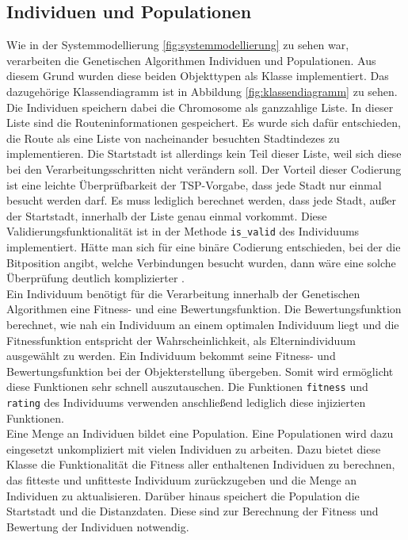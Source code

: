 \subsection{Individuen und Populationen}
Wie in der Systemmodellierung \ref{fig:systemmodellierung} zu sehen war, verarbeiten die Genetischen Algorithmen Individuen und Populationen. Aus diesem Grund wurden diese beiden Objekttypen als Klasse implementiert. Das dazugehörige Klassendiagramm ist in Abbildung \ref{fig:klassendiagramm} zu sehen.
Die Individuen speichern dabei die Chromosome als ganzzahlige Liste. In dieser Liste sind die Routeninformationen gespeichert. Es wurde sich dafür entschieden, die Route als eine Liste von nacheinander besuchten Stadtindezes zu implementieren. Die Startstadt ist allerdings kein Teil dieser Liste, weil sich diese bei den Verarbeitungsschritten nicht verändern soll.
Der Vorteil dieser Codierung ist eine leichte Überprüfbarkeit der TSP-Vorgabe, dass jede Stadt nur einmal besucht werden darf. Es muss lediglich berechnet werden, dass jede Stadt, außer der Startstadt, innerhalb der Liste genau einmal vorkommt. Diese Validierungsfunktionalität ist in der Methode \texttt{is\_valid} des Individuums implementiert.
Hätte man sich für eine binäre Codierung entschieden, bei der die Bitposition angibt, welche Verbindungen besucht wurden, dann wäre eine solche Überprüfung deutlich komplizierter \cite[S. 271-271]{schoeneburg}.\\
Ein Individuum benötigt für die Verarbeitung innerhalb der Genetischen Algorithmen eine Fitness- und eine Bewertungsfunktion. Die Bewertungsfunktion berechnet, wie nah ein Individuum an einem optimalen Individuum liegt und die Fitnessfunktion entspricht der Wahrscheinlichkeit, als Elternindividuum ausgewählt zu werden.
Ein Individuum bekommt seine Fitness- und Bewertungsfunktion bei der Objekterstellung übergeben. Somit wird ermöglicht diese Funktionen sehr schnell auszutauschen. Die Funktionen \texttt{fitness} und \texttt{rating} des Individuums verwenden anschließend lediglich diese injizierten Funktionen.\\
Eine Menge an Individuen bildet eine Population. Eine Populationen wird dazu eingesetzt unkompliziert mit vielen Individuen zu arbeiten. Dazu bietet diese Klasse die Funktionalität die Fitness aller enthaltenen Individuen zu berechnen, das fitteste und unfitteste Individuum zurückzugeben und die Menge an Individuen zu aktualisieren.
Darüber hinaus speichert die Population die Startstadt und die Distanzdaten. Diese sind zur Berechnung der Fitness und Bewertung der Individuen notwendig.
